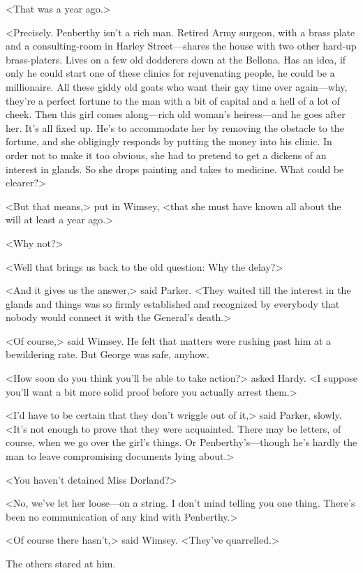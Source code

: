 <That was a year ago.>

<Precisely. Penberthy isn't a rich man. Retired Army surgeon, with a brass plate and a consulting-room in Harley Street—shares the house with two other hard-up brass-platers. Lives on a few old dodderers down at the Bellona. Has an idea, if only he could start one of these clinics for rejuvenating people, he could be a millionaire. All these giddy old goats who want their gay time over again—why, they're a perfect fortune to the man with a bit of capital and a hell of a lot of cheek. Then this girl comes along—rich old woman's heiress—and he goes after her. It's all fixed up. He's to accommodate her by removing the obstacle to the fortune, and she obligingly responds by putting the money into his clinic. In order not to make it too obvious, she had to pretend to get a dickens of an interest in glands. So she drops painting and takes to medicine. What could be clearer?>

<But that means,> put in Wimsey, <that she must have known all about the will at least a year ago.>

<Why not?>

<Well that brings us back to the old question: Why the delay?>

<And it gives us the answer,> said Parker. <They waited till the interest in the glands and things was so firmly established and recognized by everybody that nobody would connect it with the General's death.>

<Of course,> said Wimsey. He felt that matters were rushing past him at a bewildering rate. But George was safe, anyhow.

<How soon do you think you'll be able to take action?> asked Hardy. <I suppose you'll want a bit more solid proof before you actually arrest them.>

<I'd have to be certain that they don't wriggle out of it,> said Parker, slowly. <It's not enough to prove that they were acquainted. There may be letters, of course, when we go over the girl's things. Or Penberthy's—though he's hardly the man to leave compromising documents lying about.>

<You haven't detained Miss Dorland?>

<No, we've let her loose—on a string. I don't mind telling you one thing. There's been no communication of any kind with Penberthy.>

<Of course there hasn't,> said Wimsey. <They've quarrelled.>

The others stared at him.

